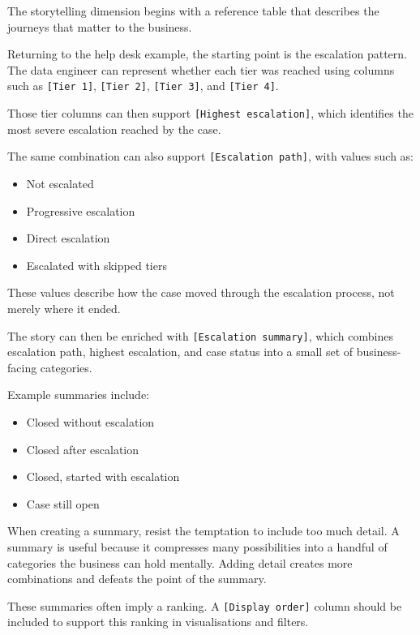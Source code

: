 \documentclass[10pt,openany,10pt]{book}
\providecommand{\tightlist}{%
  \setlength{\itemsep}{0pt}\setlength{\parskip}{0pt}}
\begin{document}
The storytelling dimension begins with a reference table that describes
the journeys that matter to the business.

Returning to the help desk example, the starting point is the escalation
pattern. The data engineer can represent whether each tier was reached
using columns such as \texttt{{[}Tier\ 1{]}}, \texttt{{[}Tier\ 2{]}},
\texttt{{[}Tier\ 3{]}}, and \texttt{{[}Tier\ 4{]}}.

Those tier columns can then support \texttt{{[}Highest\ escalation{]}},
which identifies the most severe escalation reached by the case.

The same combination can also support \texttt{{[}Escalation\ path{]}},
with values such as:

\begin{itemize}
\tightlist
\item
  Not escalated
\item
  Progressive escalation
\item
  Direct escalation
\item
  Escalated with skipped tiers
\end{itemize}

These values describe how the case moved through the escalation process,
not merely where it ended.

The story can then be enriched with \texttt{{[}Escalation\ summary{]}},
which combines escalation path, highest escalation, and case status into
a small set of business-facing categories.

Example summaries include:

\begin{itemize}
\tightlist
\item
  Closed without escalation
\item
  Closed after escalation
\item
  Closed, started with escalation
\item
  Case still open
\end{itemize}

When creating a summary, resist the temptation to include too much
detail. A summary is useful because it compresses many possibilities
into a handful of categories the business can hold mentally. Adding
detail creates more combinations and defeats the point of the summary.

These summaries often imply a ranking. A \texttt{{[}Display\ order{]}}
column should be included to support this ranking in visualisations and
filters.
\end{document}
